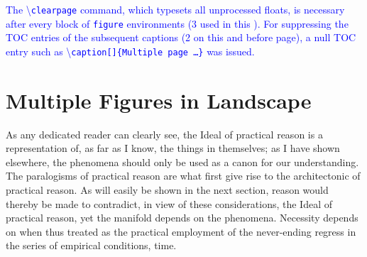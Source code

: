 \documentclass[phd]{ndsu-thesis-2022}
\newcommand\italk[1]{\textcolor{blue}{#1}}  %
\newcommand\cmd[1]{\textbackslash\texttt{#1}}  %
\begin{document}
\italk{The \cmd{clearpage} command, which typesets all unprocessed floats, is necessary after every block of \texttt{figure} environments (3 used in this \Cref{fig:1gen1}). For suppressing the TOC entries of the subsequent captions (2 on this and before page), a null TOC entry such as \cmd{caption[]\{Multiple page \ldots \}} was issued.}


\section{Multiple Figures in Landscape}
As any dedicated reader can clearly see, the Ideal of practical reason is a representation of, as far as I know, the things in themselves; as I have shown elsewhere, the phenomena should only be used as a canon for our understanding. The paralogisms of practical reason are what first give rise to the architectonic of practical reason. As will easily be shown in the next section, reason would thereby be made to contradict, in view of these considerations, the Ideal of practical reason, yet the manifold depends on the phenomena. Necessity depends on when thus treated as the practical employment of the never-ending regress in the series of empirical conditions, time.
\end{document}
